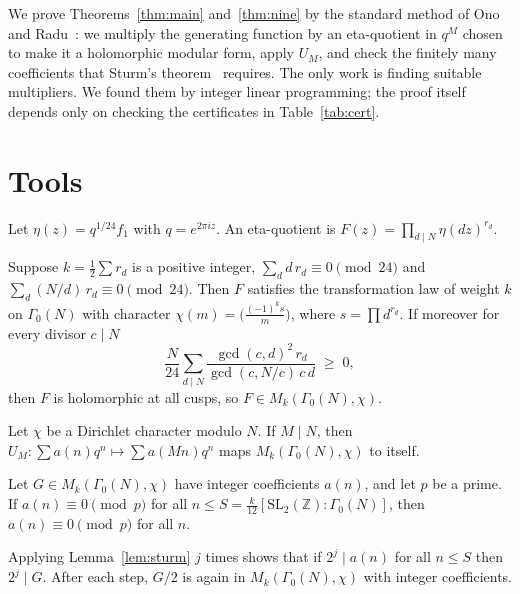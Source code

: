 \documentclass[11pt]{article}
\theoremstyle{remark}\newtheorem{remark}[theorem]{Remark}
\begin{document}
We prove Theorems~\ref{thm:main} and~\ref{thm:nine} by the standard method of Ono and Radu~\cite{Ono,Radu}: we multiply the generating function by an eta-quotient in $q^M$ chosen to make it a holomorphic modular form, apply $U_M$, and check the finitely many coefficients that Sturm's theorem~\cite{Sturm} requires. The only work is finding suitable multipliers. We found them by integer linear programming; the proof itself depends only on checking the certificates in Table~\ref{tab:cert}.

\section{Tools}
Let $\eta(z)=q^{1/24}f_1$ with $q=e^{2\pi iz}$. An eta-quotient is $F(z)=\prod_{d\mid N}\eta(dz)^{r_d}$.

\begin{lemma}\label{lem:ghn}
Suppose $k=\tfrac12\sum r_d$ is a positive integer, $\sum_d d\,r_d\equiv0\pmod{24}$ and $\sum_d (N/d)\,r_d\equiv0\pmod{24}$. Then $F$ satisfies the transformation law of weight $k$ on $\Gamma_0(N)$ with character $\chi(m)=\bigl(\tfrac{(-1)^ks}{m}\bigr)$, where $s=\prod d^{r_d}$. If moreover for every divisor $c\mid N$
\[\frac{N}{24}\sum_{d\mid N}\frac{\gcd(c,d)^2\,r_d}{\gcd(c,N/c)\,c\,d}\;\ge\;0,\]
then $F$ is holomorphic at all cusps, so $F\in M_k(\Gamma_0(N),\chi)$.
\end{lemma}

\begin{lemma}\label{lem:U}
Let $\chi$ be a Dirichlet character modulo $N$. If $M\mid N$, then $U_M:\sum a(n)q^n\mapsto\sum a(Mn)q^n$ maps $M_k(\Gamma_0(N),\chi)$ to itself.
\end{lemma}

\begin{lemma}\label{lem:sturm}
Let $G\in M_k(\Gamma_0(N),\chi)$ have integer coefficients $a(n)$, and let $p$ be a prime. If $a(n)\equiv0\pmod p$ for all $n\le S=\tfrac{k}{12}[\mathrm{SL}_2(\mathbb Z):\Gamma_0(N)]$, then $a(n)\equiv0\pmod p$ for all $n$.
\end{lemma}

Applying Lemma~\ref{lem:sturm} $j$ times shows that if $2^j\mid a(n)$ for all $n\le S$ then $2^j\mid G$. After each step, $G/2$ is again in $M_k(\Gamma_0(N),\chi)$ with integer coefficients.
\end{document}
